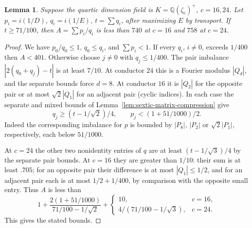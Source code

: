 \documentclass[11pt,reqno]{amsart}
\newtheorem{lemma}[theorem]{Lemma}
\theoremstyle{remark}\newtheorem{remark}[theorem]{Remark}
\numberwithin{equation}{section}
\begin{document}
\begin{lemma}\label{lem:quartic-large-mass-height}
Suppose the quartic dimension field is $K=\mathbb Q(\zeta_c)^+$,
$c=16,24$. Let $p_i=i(1/D)$,
$q_i=i(1/E)$, $t=\sum q_i$, after maximizing $E$ by transport.
If $t\ge71/100$, then $A=\sum p_i/q_i$ is less than $740$ at
$c=16$ and $758$ at $c=24$.
\end{lemma}
\begin{proof}
We have $p_0/q_0\le1$, $q_0\le q_i$, and $\sum p_i<1$. If every
$q_i$, $i\ne0$, exceeds $1/400$ then $A<401$. Otherwise choose
$j\ne0$ with $q_j\le1/400$. The pair imbalance
$|2(q_0+q_j)-t|$ is at least $7/10$. At conductor $24$
this is a Fourier modulus $|Q_d|$, and the separate bounds force
$d=8$. At conductor $16$ it is $|Q_2|$ for the opposite pair
or at most $\sqrt2|Q_1|$ for an adjacent pair (cyclic indices).
In each case the separate and mixed bounds of
Lemma~\ref{lem:sextic-matrix-compression} give
\[
 q_j\ge(t-1/\sqrt2)/4,\qquad
 p_j<(1+51/1000)/2 .
\]
Indeed the corresponding imbalance for $p$ is bounded by $|P_8|$,
$|P_2|$ or $\sqrt2|P_1|$, respectively, each below $51/1000$.

At $c=24$ the other two nonidentity entries of $q$ are at least
$(t-1/\sqrt3)/4$ by the separate pair bounds. At $c=16$ they are
greater than $1/10$: their sum is at least $.705$; for an opposite
pair their difference is at most $|Q_1|\le1/2$, and for an adjacent
pair each is at most $1/2+1/400$, by comparison with the opposite
small entry. Thus $A$ is less than
\[
 1+\frac{2(1+51/1000)}{71/100-1/\sqrt2}
    +\begin{cases}10,&c=16,\\4/(71/100-1/\sqrt3),&c=24.\end{cases}
\]
This gives the stated bounds.
\end{proof}
\end{document}
